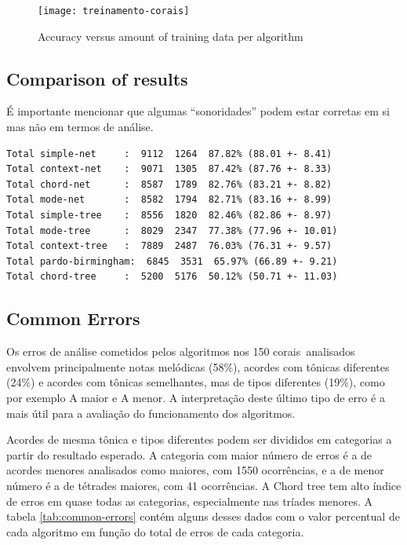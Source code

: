 \documentclass{article}
\begin{document}
\begin{figure}
  \texttt{[image: treinamento-corais]}
  \caption{Accuracy versus amount of training data per algorithm}
  \label{fig:treinamento-corais}
\end{figure}

\subsection{Comparison of results}
\label{sec:comparison-results}

É importante mencionar que algumas ``sonoridades'' podem estar
corretas em si mas não em termos de análise.

\begin{verbatim}
Total simple-net     :  9112  1264  87.82% (88.01 +- 8.41)
Total context-net    :  9071  1305  87.42% (87.76 +- 8.33)
Total chord-net      :  8587  1789  82.76% (83.21 +- 8.82)
Total mode-net       :  8582  1794  82.71% (83.16 +- 8.99)
Total simple-tree    :  8556  1820  82.46% (82.86 +- 8.97)
Total mode-tree      :  8029  2347  77.38% (77.96 +- 10.01)
Total context-tree   :  7889  2487  76.03% (76.31 +- 9.57)
Total pardo-birmingham:  6845  3531  65.97% (66.89 +- 9.21)
Total chord-tree     :  5200  5176  50.12% (50.71 +- 11.03)
\end{verbatim}


\subsection{Common Errors}

Os erros de análise cometidos pelos algoritmos nos 150 corais\
analisados envolvem principalmente notas melódicas (58\%), acordes com
tônicas diferentes (24\%) e acordes com tônicas semelhantes, mas de
tipos diferentes (19\%), como por exemplo A maior e A menor. A
interpretação deste último tipo de erro é a mais útil para a avaliação
do funcionamento dos algoritmos.

Acordes de mesma tônica e tipos diferentes podem ser divididos em
categorias a partir do resultado esperado. A categoria com maior
número de erros é a de acordes menores analisados como maiores, com
1550 ocorrências, e a de menor número é a de tétrades maiores, com 41
ocorrências. A Chord tree tem alto índice de erros em quase todas as
categorias, especialmente nas tríades menores. A tabela
\ref{tab:common-errors} contém alguns desses dados com o valor
percentual de cada algoritmo em função do total de erros de cada
categoria.
\end{document}
